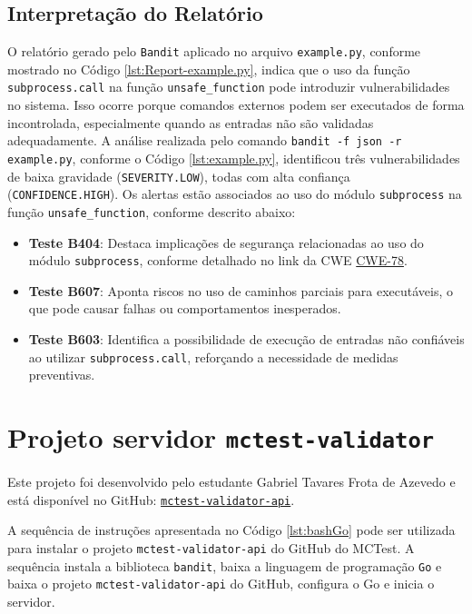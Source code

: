\subsection{Interpretação do Relatório}

O relatório gerado pelo \texttt{Bandit} aplicado no arquivo \texttt{example.py}, conforme mostrado no Código \ref{lst:Report-example.py}, indica que o uso da função \texttt{subprocess.call} na função \texttt{unsafe\_function} pode introduzir vulnerabilidades no sistema. Isso ocorre porque comandos externos podem ser executados de forma incontrolada, especialmente quando as entradas não são validadas adequadamente.
%
A análise realizada pelo comando \texttt{bandit -f json -r example.py}, conforme o Código \ref{lst:example.py}, identificou três vulnerabilidades de baixa gravidade (\texttt{SEVERITY.LOW}), todas com alta confiança (\texttt{CONFIDENCE.HIGH}). Os alertas estão associados ao uso do módulo \texttt{subprocess} na função \texttt{unsafe\_function}, conforme descrito abaixo:

\begin{itemize}
    \item \textbf{Teste B404}: Destaca implicações de segurança relacionadas ao uso do módulo \texttt{subprocess}, conforme detalhado no link da CWE \href{https://cwe.mitre.org/data/definitions/78.html}{CWE-78}.
    \item \textbf{Teste B607}: Aponta riscos no uso de caminhos parciais para executáveis, o que pode causar falhas ou comportamentos inesperados.
    \item \textbf{Teste B603}: Identifica a possibilidade de execução de entradas não confiáveis ao utilizar \texttt{subprocess.call}, reforçando a necessidade de medidas preventivas.
\end{itemize}


\section{Projeto servidor \texttt{mctest-validator}}\label{sec:projeto-servidor-mctest-validator}

Este projeto foi desenvolvido pelo estudante Gabriel Tavares Frota de Azevedo e está disponível no GitHub: \href{https://github.com/leirbagseravat/mctest-validator-api}{\texttt{mctest-validator-api}}.


A sequência de instruções apresentada no Código \ref{lst:bashGo} pode ser utilizada para instalar o projeto \texttt{mctest-validator-api} do GitHub do MCTest. A sequência instala a biblioteca \texttt{bandit}, baixa a linguagem de programação \texttt{Go} e baixa o projeto \texttt{mctest-validator-api} do GitHub, configura o Go e inicia o servidor.

